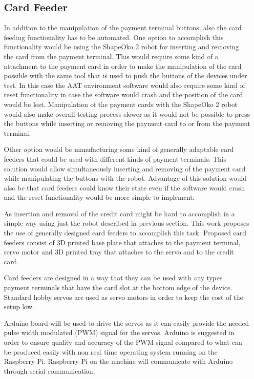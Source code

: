 \FloatBarrier
\subsection{Card Feeder}
\label{subsection:Card feeder}

In addition to the manipulation of the payment terminal buttons, also the card feeding functionality has to be automated. One option to accomplish this functionality would be using the ShapeOko 2 robot for inserting and removing the card from the payment terminal. This would require some kind of a attachment to the payment card in order to make the manipulation of the card possible with the same tool that is used to push the buttons of the devices under test. In this case the AAT environment software would also require some kind of reset functionality in case the software would crash and the position of the card would be lost. Manipulation of the payment cards with the ShapeOko 2 robot would also make overall testing process slower as it would not be possible to press the buttons while inserting or removing the payment card to or from the payment terminal.

Other option would be manufacturing some kind of generally adaptable card feeders that could be used with different kinds of payment terminals. This solution would allow simultaneously inserting and removing of the payment card while manipulating the buttons with the robot. Advantage of this solution would also be that card feeders could know their state even if the software would crash and the reset functionality would be more simple to implement.

As insertion and removal of the credit card might be hard to accomplish in a simple way using just the robot described in previous section. This work proposes the use of generally designed card feeders to accomplish this task. Proposed card feeders consist of 3D printed base plate that attaches to the payment terminal, servo motor and 3D printed tray that attaches to the servo and to the credit card.

Card feeders are designed in a way that they can be used with any types payment terminals that have the card slot at the bottom edge of the device. Standard hobby servos are used as servo motors in order to keep the cost of the setup low.

Arduino board will be used to drive the servos as it can easily provide the needed pulse width modulated (PWM) signal for the servos. Arduino is suggested in order to ensure quality and accuracy of the PWM signal compared to what can be produced easily with non real time operating system running on the Raspberry Pi. Raspberry Pi on the machine will communicate with Arduino through serial communication.

